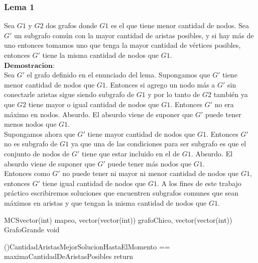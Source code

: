 \subsubsection*{Lema 1}
\noindent Sea $G1$ y $G2$ dos grafos donde $G1$ es el que tiene menor cantidad de nodos. Sea $G'$ un subgrafo común con la mayor cantidad de aristas posibles, y si hay más de uno entonces tomamos uno que tenga la mayor cantidad de vértices posibles, entonces $G'$ tiene la misma cantidad de nodos que $G1$. \\
$\mathbf{Demostraci\acute{o}n:}$ \\
\noindent Sea $G'$ el grafo definido en el enunciado del lema. Supongamos que $G'$ tiene menor cantidad de nodos que $G1$. Entonces si agrego un nodo más a $G'$ sin conectarle aristas sigue siendo subgrafo de $G1$ y por lo tanto de $G2$ también ya que $G2$ tiene mayor o igual cantidad de nodos que $G1$. Entonces $G'$ no era máximo en nodos. Absurdo. El absurdo viene de suponer que $G'$ puede tener menos nodos que $G1$. \\
Supongamos ahora que $G'$ tiene mayor cantidad de nodos que $G1$. Entonces $G'$ no es subgrafo de $G1$ ya que una de las condiciones para ser subgrafo es que el conjunto de nodos de $G'$ tiene que estar incluido en el de $G1$. Absurdo. El absurdo viene de suponer que $G'$ puede tener más nodos que $G1$.\\
Entonces como $G'$ no puede tener ni mayor ni menor cantidad de nodos que $G1$, entonces $G'$ tiene igual cantidad de nodos que $G1$. A los fines de este trabajo práctico escribiremos soluciones que encuentren subgrafos comunes que sean máximos en aristas y que tengan la misma cantidad de nodos que $G1$.\\


\begin{algoritmo}{MCS}{vector(int) mapeo, vector(vector(int)) grafoChico, vector(vector(int)) GrafoGrande }{void}

	\If(){CantidadAristasMejorSolucionHastaElMomento == maximaCantidadDeAristasPosibles}{
return \;
	}
\end{algoritmo}




